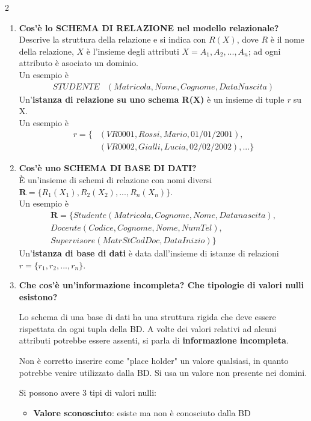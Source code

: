 \documentclass{article}
\newcommand{\sitemize}[1]{%
  \begin{itemize}[label=$\diamond$]
    #1
  \end{itemize}
}
\newcounter{esempio}
\begin{document}
\begin{multicols}{2}
\begin{enumerate}[leftmargin=*, align=left]
		\item \textbf{Cos'è lo SCHEMA DI RELAZIONE nel modello relazionale?}\\
		Descrive la struttura della relazione e si indica con $R(X)$, dove $R$ è il nome della relazione, $X$ è l'insieme degli attributi $X = A_1,A_2,...,A_n$; ad ogni attributo è asociato un dominio. \\
		Un esempio è \begin{align*}
			STUDENTE&(Matricola,Nome, Cognome,DataNascita)
		\end{align*}
		Un'\textbf{istanza di relazione su uno schema R(X)} è un insieme di tuple \textit{r} su X.\\
		Un esempio è \begin{align*}
			r = \{ &(VR0001, Rossi, Mario, 01/01/2001),\\
			&(VR0002, Gialli, Lucia, 02/02/2002), ... \}
		\end{align*}
		
		\item \textbf{Cos'è uno SCHEMA DI BASE DI DATI?}\\
		È un'insieme di schemi di relazione con nomi diversi $\boldsymbol{R}= \{  R_1(X_1), R_2(X_2), ..., R_n(X_n) \}$.\\
		Un esempio è \begin{align*}
			\boldsymbol{R} = \{ Studente(Matricola, Cognome, Nome, Datanascita),\\
			Docente(Codice, Cognome, Nome, NumTel), \\ Supervisore(MatrSt CodDoc, DataInizio)\}
		\end{align*}
		Un'\textbf{istanza di base di dati} è data dall'insieme di istanze di relazioni $r = \{r_1,r_2,...,r_n\}$.
		
		\item \textbf{Che cos'è un'informazione incompleta? Che tipologie di valori nulli esistono?}
		
		Lo schema di una base di dati ha una struttura rigida che deve essere rispettata da ogni tupla della BD.
		A volte dei valori relativi ad alcuni attributi potrebbe essere assenti, si parla di \textbf{informazione incompleta}.
		
		Non è corretto inserire come "place holder" un valore qualsiasi, in quanto potrebbe venire utilizzato dalla BD. Si usa un valore non presente nei domini.
		
		Si possono avere 3 tipi di valori nulli:
		\sitemize{\item \textbf{Valore sconosciuto}: esiste ma non è conosciuto dalla BD
			
}
\end{enumerate}
\end{multicols}
\end{document}
